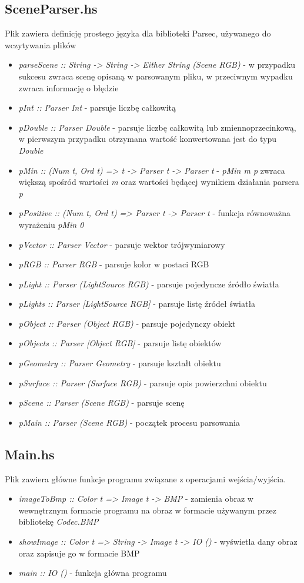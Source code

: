 \documentclass[11pt,a4paper]{article}
\begin{document}
\subsection{SceneParser.hs}
Plik zawiera definicję prostego języka dla biblioteki Parsec, używanego do wczytywania plików
\begin{itemize}
\item\textit{parseScene :: String -> String -> Either String (Scene RGB)} - w przypadku sukcesu zwraca scenę opisaną w parsowanym pliku, w przeciwnym wypadku zwraca informację o błędzie
\item\textit{pInt :: Parser Int} - parsuje liczbę całkowitą
\item\textit{pDouble :: Parser Double} - parsuje liczbę całkowitą lub zmiennoprzecinkową, w pierwszym przypadku otrzymana wartość konwertowana jest do typu \textit{Double}
\item\textit{pMin :: (Num t, Ord t) => t -> Parser t -> Parser t} - \textit{pMin m p} zwraca większą spośród wartości \textit{m} oraz wartości będącej wynikiem działania parsera \textit{p}
\item\textit{pPositive :: (Num t, Ord t) => Parser t -> Parser t} - funkcja równoważna wyrażeniu \textit{pMin 0}
\item\textit{pVector :: Parser Vector} - parsuje wektor trójwymiarowy
\item\textit{pRGB :: Parser RGB} - parsuje kolor w postaci RGB
\item\textit{pLight :: Parser (LightSource RGB)} - parsuje pojedyncze źródło światła
\item\textit{pLights :: Parser [LightSource RGB]} - parsuje listę źródeł światła
\item\textit{pObject :: Parser (Object RGB)} - parsuje pojedynczy obiekt
\item\textit{pObjects :: Parser [Object RGB]} - parsuje listę obiektów
\item\textit{pGeometry :: Parser Geometry} - parsuje kształt obiektu
\item\textit{pSurface :: Parser (Surface RGB)} - parsuje opis powierzchni obiektu
\item\textit{pScene :: Parser (Scene RGB)} - parsuje scenę
\item\textit{pMain :: Parser (Scene RGB)} - początek procesu parsowania
\end{itemize}
\subsection{Main.hs}
Plik zawiera główne funkcje programu związane z operacjami wejścia/wyjścia.
\begin{itemize}
\item\textit{imageToBmp :: Color t => Image t -> BMP} - zamienia obraz w wewnętrznym formacie programu na obraz w formacie używanym przez bibliotekę \textit{Codec.BMP}
\item\textit{showImage :: Color t => String -> Image t -> IO ()} - wyświetla dany obraz oraz zapisuje go w formacie BMP
\item\textit{main :: IO ()} - funkcja główna programu
\end{itemize}
\end{document}
